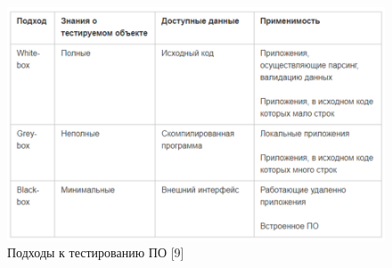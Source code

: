 	\begin{figure}[ht] 
		\center
		\includegraphics [scale=1] {my_folder/images/white-gray-black-box}
		\caption{Подходы к тестированию ПО [9]} 
		\label{fig:white-gray-black-box-ch2}  
	\end{figure}
	
%	
%
%
%
%
%
%	
%
%
%

	
%	
%	
%
%	

